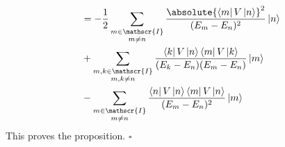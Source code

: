 \documentclass[10pt,fleqn]{article}
\newcommand{\bra}[1]{\left\langle #1 \right\vert}
\newcommand{\ket}[1]{\left\vert #1 \right\rangle}
\begin{document}
\begin{multicols}{2}
\begin{align*}
        &= -\frac{1}{2} \sum_{\substack{m\in\mathscr{I}\\m\neq n}} \frac{\absolute{\bra{m}V\ket{n}}^2}{(E_m-E_n)^2} \ket{n} \\
        &+ \sum_{\substack{m,k\in\mathscr{I}\\m,k\neq n}} \frac{\bra{k}V\ket{n} \bra{m}V\ket{k}}{(E_k-E_n)(E_m-E_n)} \ket{m} \\
        &- \sum_{\substack{m\in\mathscr{I}\\m\neq n}} \frac{\bra{n}V\ket{n} \bra{m}V\ket{n}}{(E_m-E_n)^2} \ket{m}
      \end{align*}
      This proves the proposition.
      \hfill$\square{}$
  \end{multicols}

  \newpage
\end{document}
